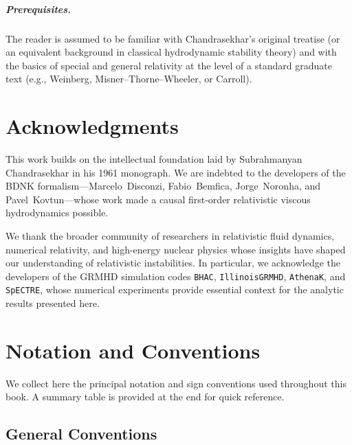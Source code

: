 \documentclass[12pt]{book}
\begin{document}
\paragraph{Prerequisites.}
The reader is assumed to be familiar with Chandrasekhar's original treatise (or
an equivalent background in classical hydrodynamic stability theory) and with
the basics of special and general relativity at the level of a standard
graduate text (e.g., Weinberg, Misner--Thorne--Wheeler, or Carroll).

\chapter{Acknowledgments}
\label{ch:acknowledgments}

This work builds on the intellectual foundation laid by Subrahmanyan
Chandrasekhar in his 1961 monograph.  We are indebted to the developers of
the BDNK formalism---Marcelo~Disconzi, Fabio~Bemfica, Jorge~Noronha, and
Pavel~Kovtun---whose work made a causal first-order relativistic viscous
hydrodynamics possible.

We thank the broader community of researchers in relativistic fluid dynamics,
numerical relativity, and high-energy nuclear physics whose insights have
shaped our understanding of relativistic instabilities.  In particular, we
acknowledge the developers of the GRMHD simulation codes
\texttt{BHAC}, \texttt{IllinoisGRMHD}, \texttt{AthenaK}, and
\texttt{SpECTRE}, whose numerical experiments provide essential context for
the analytic results presented here.

\chapter{Notation and Conventions}
\label{ch:notation}

We collect here the principal notation and sign conventions used throughout
this book.  A summary table is provided at the end for quick reference.

\section*{General Conventions}
\end{document}
